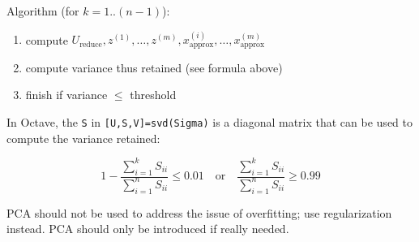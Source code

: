 \documentclass[a4paper,11pt]{scrartcl}
\begin{document}
Algorithm (for $k=1..(n-1)$):

\begin{enumerate}
    \item compute $U_{\text{reduce}}, z^{(1)}, \dots, z^{(m)}, x_{\text{approx}}^{(i)}, \dots, x_{\text{approx}}^{(m)}$
    \item compute variance thus retained (see formula above)
    \item finish if variance $\leq$ threshold
\end{enumerate}

In Octave, the \texttt{S} in \texttt{[U,S,V]=svd(Sigma)} is a diagonal matrix that can be used to compute the variance retained:

$$ 1 - \frac{\sum_{i=1}^k S_{ii}}{\sum_{i=1}^n S_{ii}} \leq 0.01 \quad \text{or} \quad \frac{\sum_{i=1}^k S_{ii}}{\sum_{i=1}^n S_{ii}} \geq 0.99 $$

PCA should not be used to address the issue of overfitting; use regularization instead. PCA should only be introduced if really needed.
\end{document}
